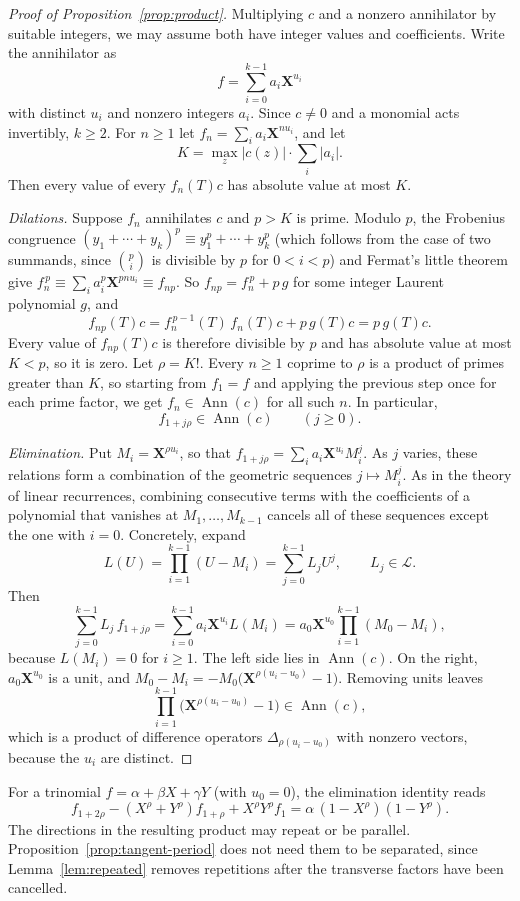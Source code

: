 \documentclass[11pt,a4paper,reqno]{amsart}
\theoremstyle{definition}
\theoremstyle{remark}
\newcommand{\LL}{\mathcal L}
\newcommand{\mon}[1]{\boldsymbol X^{#1}}
\newcommand{\De}{\Delta}
\DeclareMathOperator{\Ann}{Ann}
\numberwithin{equation}{section}
\begin{document}
\begin{proof}[Proof of Proposition~\ref{prop:product}]
Multiplying $c$ and a nonzero annihilator by suitable integers, we may assume both have integer values and coefficients. Write the annihilator as
\[
 f=\sum_{i=0}^{k-1}a_i\mon{u_i}
\]
with distinct $u_i$ and nonzero integers $a_i$. Since $c\ne0$ and a monomial acts invertibly, $k\ge2$. For $n\ge1$ let $f_n=\sum_ia_i\mon{nu_i}$, and let
\[
 K=\max_z|c(z)|\cdot\sum_i|a_i|.
\]
Then every value of every $f_n(T)c$ has absolute value at most $K$.

\emph{Dilations.} Suppose $f_n$ annihilates $c$ and $p>K$ is prime. Modulo $p$, the Frobenius congruence $(y_1+\cdots+y_k)^p\equiv y_1^p+\cdots+y_k^p$ (which follows from the case of two summands, since $\binom pi$ is divisible by $p$ for $0<i<p$) and Fermat's little theorem give $f_n^{\,p}\equiv\sum_ia_i^p\mon{pnu_i}\equiv f_{np}$. So $f_{np}=f_n^{\,p}+p\,g$ for some integer Laurent polynomial $g$, and
\[
 f_{np}(T)c=f_n^{\,p-1}(T)\,f_n(T)c+p\,g(T)c=p\,g(T)c.
\]
Every value of $f_{np}(T)c$ is therefore divisible by $p$ and has absolute value at most $K<p$, so it is zero. Let $\rho=K!$. Every $n\ge1$ coprime to $\rho$ is a product of primes greater than $K$, so starting from $f_1=f$ and applying the previous step once for each prime factor, we get $f_n\in\Ann(c)$ for all such $n$. In particular,
\[
 f_{1+j\rho}\in\Ann(c)\qquad(j\ge0).
\]

\emph{Elimination.} Put $M_i=\mon{\rho u_i}$, so that $f_{1+j\rho}=\sum_ia_i\mon{u_i}M_i^j$. As $j$ varies, these relations form a combination of the geometric sequences $j\mapsto M_i^j$. As in the theory of linear recurrences, combining consecutive terms with the coefficients of a polynomial that vanishes at $M_1,\ldots,M_{k-1}$ cancels all of these sequences except the one with $i=0$. Concretely, expand
\[
 L(U)=\prod_{i=1}^{k-1}(U-M_i)=\sum_{j=0}^{k-1}L_jU^j,\qquad L_j\in\LL.
\]
Then
\[
 \sum_{j=0}^{k-1}L_j\,f_{1+j\rho}=\sum_{i=0}^{k-1}a_i\mon{u_i}L(M_i)=a_0\mon{u_0}\prod_{i=1}^{k-1}(M_0-M_i),
\]
because $L(M_i)=0$ for $i\ge1$. The left side lies in $\Ann(c)$. On the right, $a_0\mon{u_0}$ is a unit, and $M_0-M_i=-M_0\bigl(\mon{\rho(u_i-u_0)}-1\bigr)$. Removing units leaves
\[
 \prod_{i=1}^{k-1}\bigl(\mon{\rho(u_i-u_0)}-1\bigr)\in\Ann(c),
\]
which is a product of difference operators $\De_{\rho(u_i-u_0)}$ with nonzero vectors, because the $u_i$ are distinct.
\end{proof}

For a trinomial $f=\alpha+\beta X+\gamma Y$ (with $u_0=0$), the elimination identity reads
\[
 f_{1+2\rho}-(X^\rho+Y^\rho)f_{1+\rho}+X^\rho Y^\rho f_1=\alpha\,(1-X^\rho)(1-Y^\rho).
\]
The directions in the resulting product may repeat or be parallel. Proposition~\ref{prop:tangent-period} does not need them to be separated, since Lemma~\ref{lem:repeated} removes repetitions after the transverse factors have been cancelled.
\end{document}
